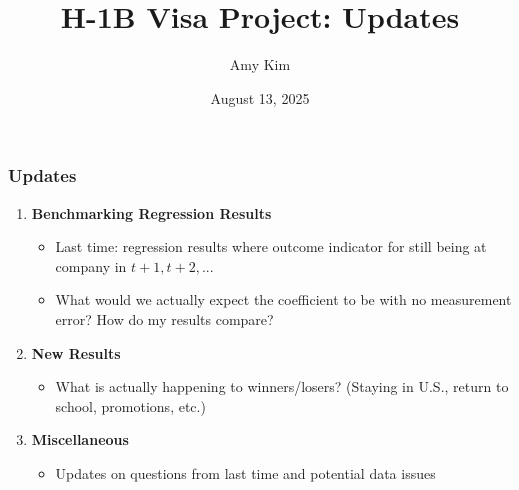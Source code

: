 \documentclass[xcolor=dvipsnames, compress, 12pt, aspectratio=169, handout]{beamer}
\title{H-1B Visa Project: Updates}
\author{Amy Kim}
\date{August 13, 2025}
\begin{document}
\begin{frame}[plain]
    \titlepage
    \addtocounter{framenumber}{-1}
\end{frame}

\begin{frame}
    \frametitle{Updates}
    \begin{enumerate}
        \item \textbf{Benchmarking Regression Results}
        \begin{itemize}
            \item Last time: regression results where outcome indicator for still being at company in $t+1, t+2,...$ 
            \item What would we actually expect the coefficient to be with no measurement error? How do my results compare?
        \end{itemize}
        \vspace{2mm}
        \item \textbf{New Results}
        \begin{itemize}
            \item What is actually happening to winners/losers? (Staying in U.S., return to school, promotions, etc.)
        \end{itemize}
        \vspace{2mm}
        \item \textbf{Miscellaneous}
        \begin{itemize}
            \item Updates on questions from last time and potential data issues
        \end{itemize}
    \end{enumerate}
\end{frame}
\end{document}
